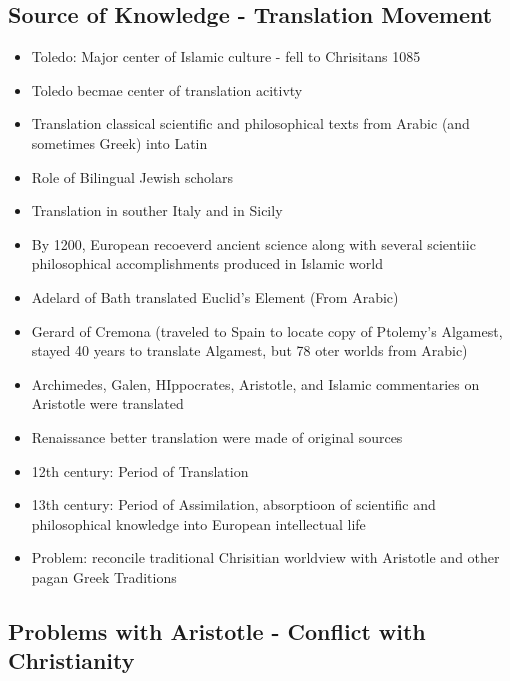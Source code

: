 \documentclass{article}
\begin{document}
\subsection{Source of Knowledge - Translation Movement}
\begin{itemize}
  \item Toledo: Major center of Islamic culture - fell to Chrisitans 1085
  \item Toledo becmae center of translation acitivty
  \item Translation classical scientific and philosophical texts
    from Arabic (and sometimes Greek) into Latin
  \item Role of Bilingual Jewish scholars
  \item Translation in souther Italy and in Sicily
  \item By 1200, European recoeverd ancient science along with several scientiic philosophical accomplishments produced
    in Islamic world
  \item Adelard of Bath translated Euclid's Element (From Arabic)
  \item Gerard of Cremona (traveled to Spain to locate copy of Ptolemy's Algamest, stayed 40 years to translate
    Algamest, but 78 oter worlds from Arabic)
  \item Archimedes, Galen, HIppocrates, Aristotle, and Islamic commentaries on Aristotle were translated
  \item Renaissance better translation were made of original sources
  \item 12th century: Period of Translation
  \item 13th century: Period of Assimilation, absorptioon of scientific and philosophical knowledge
    into European intellectual life
  \item Problem: reconcile traditional Chrisitian worldview with Aristotle and other pagan Greek Traditions
\end{itemize}

\subsection{Problems with Aristotle - Conflict with Christianity }
\end{document}
